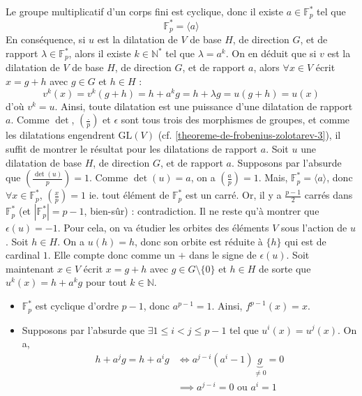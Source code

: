	\begin{demonstration}
		Le groupe multiplicatif d'un corps fini est cyclique, donc il existe $a \in \mathbb{F}_p^*$ tel que
		\[ \mathbb{F}_p^* = \langle a \rangle \]
		En conséquence, si $u$ est la dilatation de $V$ de base $H$, de direction $G$, et de rapport $\lambda \in \mathbb{F}_p^*$, alors il existe $k \in \mathbb{N}^*$ tel que $\lambda = a^k$. On en déduit que si $v$ est la dilatation de $V$ de base $H$, de direction $G$, et de rapport $a$, alors $\forall x \in V$ écrit $x = g + h$ avec $g \in G$ et $h \in H$ :
		\[ v^k(x) = v^k(g+h) = h + a^k g = h + \lambda g = u(g+h) = u(x) \]
		d'où $v^k = u$. Ainsi, toute dilatation est une puissance d'une dilatation de rapport $a$.
		\newpar
		Comme $\det$, $\left( \frac{.}{p} \right)$ et $\epsilon$ sont tous trois des morphismes de groupes, et comme les dilatations engendrent $\mathrm{GL}(V)$ (cf. \cref{theoreme-de-frobenius-zolotarev-3}), il suffit de montrer le résultat pour les dilatations de rapport $a$.
		\newpar
		Soit $u$ une dilatation de base $H$, de direction $G$, et de rapport $a$. Supposons par l'absurde que $\left( \frac{\det(u)}{p} \right) = 1$. Comme $\det(u) = a$, on a $\left( \frac{a}{p} \right) = 1$. Mais, $\mathbb{F}_p^* = \langle a \rangle$, donc $\forall x \in \mathbb{F}_p^*$, $\left( \frac{x}{p} \right) = 1$ ie. tout élément de $\mathbb{F}_p^*$ est un carré. Or, il y a $\frac{p-1}{2}$ carrés dans $\mathbb{F}_p^*$ (et $|\mathbb{F}_p^*| = p-1$, bien-sûr) : contradiction.
		\newpar
		Il ne reste qu'à montrer que $\epsilon(u) = -1$. Pour cela, on va étudier les orbites des éléments $V$ sous l'action de $u$.
		\newpar
		Soit $h \in H$. On a $u(h) = h$, donc son orbite est réduite à $\{ h \}$ qui est de cardinal $1$. Elle compte donc comme un $+$ dans le signe de $\epsilon(u)$.
		\newpar
		Soit maintenant $x \in V$ écrit $x = g + h$ avec $g \in G \setminus \{ 0 \}$ et $h \in H$ de sorte que $u^k (x) = h + a^k g$ pour tout $k \in \mathbb{N}$.
		\begin{itemize}
			\item $\mathbb{F}_p^*$ est cyclique d'ordre $p-1$, donc $a^{p-1} = 1$. Ainsi, $f^{p-1} (x) = x$.
			\item Supposons par l'absurde que $\exists 1 \leq i < j \leq p-1$ tel que $u^i(x) = u^j(x)$. On a,
			\begin{align*}
				h + a^j g = h + a^i g &\iff a^{j-i} (a^i - 1) \underbrace{g}_{\neq 0} = 0 \\
				&\implies a^{j-i} = 0 \text{ ou } a^i = 1
			\end{align*}

\end{itemize}
\end{demonstration}
